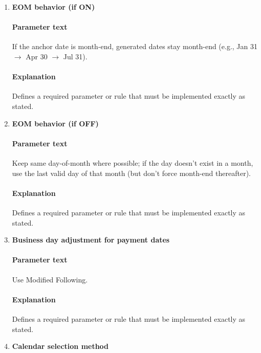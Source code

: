 \documentclass[11pt]{article}
\begin{document}
\begin{enumerate}[label=\arabic*),leftmargin=*,align=left]
\paragraph{Parameter text} User must explicitly choose $\text{EOM} = \text{ON/OFF}$ (no default).
\paragraph{Explanation} Defines a required parameter or rule that must be implemented exactly as stated.

\item \textbf{EOM behavior (if ON)}
\paragraph{Parameter text} If the anchor date is month-end, generated dates stay month-end (e.g., Jan 31 $\rightarrow$ Apr 30 $\rightarrow$ Jul 31).
\paragraph{Explanation} Defines a required parameter or rule that must be implemented exactly as stated.

\item \textbf{EOM behavior (if OFF)}
\paragraph{Parameter text} Keep same day-of-month where possible; if the day doesn’t exist in a month, use the last valid day of that month (but don’t force month-end thereafter).
\paragraph{Explanation} Defines a required parameter or rule that must be implemented exactly as stated.

\item \textbf{Business day adjustment for payment dates}
\paragraph{Parameter text} Use Modified Following.
\paragraph{Explanation} Defines a required parameter or rule that must be implemented exactly as stated.

\item \textbf{Calendar selection method}

\end{enumerate}
\end{document}
